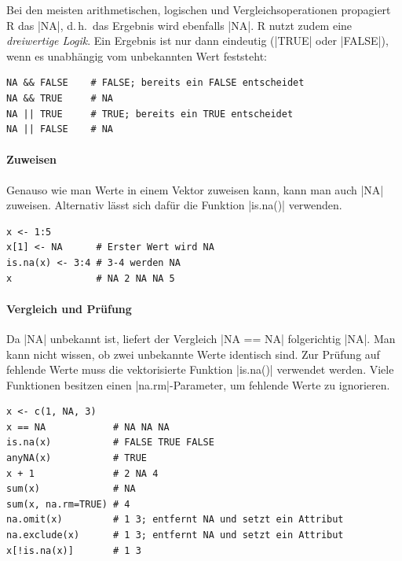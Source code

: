 \documentclass[10pt,twocolumn]{scrartcl}
\renewcommand{\lstinline}{\mycoloredinline}
\begin{document}
Bei den meisten arithmetischen, logischen und Vergleichsoperationen propagiert R das \lstinline|NA|, d.\,h.\ das Ergebnis wird ebenfalls \lstinline|NA|. R nutzt zudem eine \emph{dreiwertige Logik}. Ein Ergebnis ist nur dann eindeutig (\lstinline|TRUE| oder \lstinline|FALSE|), wenn es unabhängig vom unbekannten Wert feststeht:

\begin{lstlisting}
NA && FALSE    # FALSE; bereits ein FALSE entscheidet
NA && TRUE     # NA
NA || TRUE     # TRUE; bereits ein TRUE entscheidet
NA || FALSE    # NA
\end{lstlisting}

\paragraph{Zuweisen}

Genauso wie man Werte in einem Vektor zuweisen kann, kann man auch \lstinline|NA| zuweisen. Alternativ lässt sich dafür die Funktion \lstinline|is.na()| verwenden.

\begin{lstlisting}
x <- 1:5
x[1] <- NA      # Erster Wert wird NA
is.na(x) <- 3:4 # 3-4 werden NA
x               # NA 2 NA NA 5
\end{lstlisting}

\paragraph{Vergleich und Prüfung}

Da \lstinline|NA| unbekannt ist, liefert der Vergleich \lstinline|NA == NA| folgerichtig \lstinline|NA|. Man kann nicht wissen, ob zwei unbekannte Werte identisch sind. Zur Prüfung auf fehlende Werte muss die vektorisierte Funktion \lstinline|is.na()| verwendet werden. Viele Funktionen besitzen einen \lstinline|na.rm|-Parameter, um fehlende Werte zu ignorieren.

\begin{lstlisting}
x <- c(1, NA, 3)
x == NA            # NA NA NA
is.na(x)           # FALSE TRUE FALSE
anyNA(x)           # TRUE
x + 1              # 2 NA 4
sum(x)             # NA
sum(x, na.rm=TRUE) # 4
na.omit(x)         # 1 3; entfernt NA und setzt ein Attribut
na.exclude(x)      # 1 3; entfernt NA und setzt ein Attribut
x[!is.na(x)]       # 1 3
\end{lstlisting}
\end{document}
